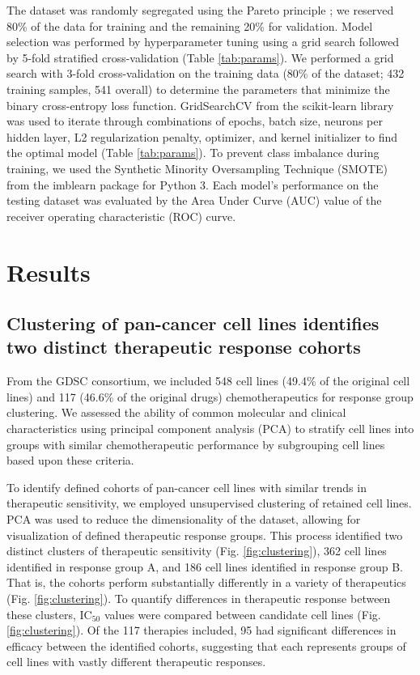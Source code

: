 \documentclass[10pt, letterpaper, twocolumn]{article}
\begin{document}
The dataset was randomly segregated using the Pareto principle \cite{pareto}; we reserved 80\% of the data for training and the remaining 20\% for validation. Model selection was performed by hyperparameter tuning using a grid search followed by 5-fold stratified cross-validation (Table \ref{tab:params}). We performed a grid search with 3-fold cross-validation on the training data (80\% of the dataset; 432 training samples, 541 overall) to determine the parameters that minimize the binary cross-entropy loss function. GridSearchCV from the scikit-learn library \cite{scikit-learn} was used to iterate through combinations of epochs, batch size, neurons per hidden layer, L2 regularization penalty, optimizer, and kernel initializer to find the optimal model (Table \ref{tab:params}). To prevent class imbalance during training, we used the Synthetic Minority Oversampling Technique (SMOTE) from the imblearn package \cite{imblearn} for Python 3. Each model’s performance on the testing dataset was evaluated by the Area Under Curve (AUC) value of the receiver operating characteristic (ROC) curve.


\section{Results}
\subsection{Clustering of pan-cancer cell lines identifies two distinct therapeutic response cohorts}
From the GDSC consortium, we included 548 cell lines (49.4\% of the original cell lines) and 117 (46.6\% of the original drugs) chemotherapeutics for response group clustering. We assessed the ability of common molecular and clinical characteristics using principal component analysis (PCA) to stratify cell lines into groups with similar chemotherapeutic performance by subgrouping cell lines based upon these criteria.

To identify defined cohorts of pan-cancer cell lines with similar trends in therapeutic sensitivity, we employed unsupervised clustering of retained cell lines. PCA was used to reduce the dimensionality of the dataset, allowing for visualization of defined therapeutic response groups. This process identified two distinct clusters of therapeutic sensitivity (Fig. \ref{fig:clustering}), 362 cell lines identified in response group A, and 186 cell lines identified in response group B. That is, the cohorts perform substantially differently in a variety of therapeutics (Fig. \ref{fig:clustering}). To quantify differences in therapeutic response between these clusters, IC$_50$ values were compared between candidate cell lines (Fig. \ref{fig:clustering}). Of the 117 therapies included, 95 had significant differences in efficacy between the identified cohorts, suggesting that each represents groups of cell lines with vastly different therapeutic responses.
\end{document}
